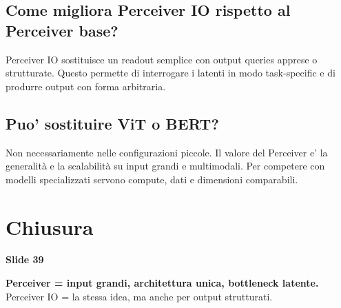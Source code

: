 \documentclass[11pt,a4paper]{article}
\newcommand{\slide}[1]{\textcolor{mainblue}{\textbf{Slide #1}}}
\begin{document}
\subsection{Come migliora Perceiver IO rispetto al Perceiver base?}
Perceiver IO sostituisce un readout semplice con output queries apprese o
strutturate. Questo permette di interrogare i latenti in modo task-specific e
di produrre output con forma arbitraria.

\subsection{Puo' sostituire ViT o BERT?}
Non necessariamente nelle configurazioni piccole. Il valore del Perceiver e'
la generalit\`a e la scalabilit\`a su input grandi e multimodali. Per competere
con modelli specializzati servono compute, dati e dimensioni comparabili.

\section*{Chiusura}
\slide{39}

\begin{center}
\Large\textbf{Perceiver = input grandi, architettura unica, bottleneck latente.}\\[0.5em]
\large Perceiver IO = la stessa idea, ma anche per output strutturati.
\end{center}
\end{document}
